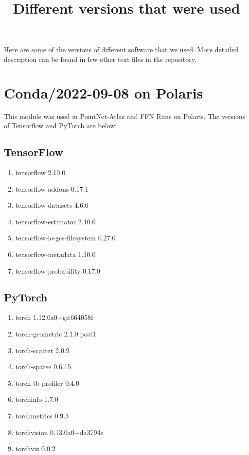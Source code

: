 \documentclass{article}
\title{Different versions that were used}
\author{}
\begin{document}
\maketitle

Here are some of the versions of different software that we used. More detailed
description can be found in few other text files in the repository.

\section{Conda/2022-09-08 on Polaris}

This module was used in PointNet-Atlas and FFN Runs on Polaris. The versions
of Tensorflow and PyTorch are below:

\subsection{TensorFlow}
\begin{enumerate}
\item tensorflow                2.10.0                   
\item tensorflow-addons         0.17.1                   
\item tensorflow-datasets       4.6.0                    
\item tensorflow-estimator      2.10.0                   
\item tensorflow-io-gcs-filesystem 0.27.0               
\item tensorflow-metadata       1.10.0                   
\item tensorflow-probability    0.17.0
\end{enumerate}

\subsection{PyTorch}
\begin{enumerate}
\item torch                     1.12.0a0+git664058f          
\item torch-geometric           2.1.0.post1              
\item torch-scatter             2.0.9                    
\item torch-sparse              0.6.15                   
\item torch-tb-profiler         0.4.0                    
\item torchinfo                 1.7.0                    
\item torchmetrics              0.9.3                    
\item torchvision               0.13.0a0+da3794e          
\item torchviz                  0.0.2                    
\end{enumerate}
\end{document}
